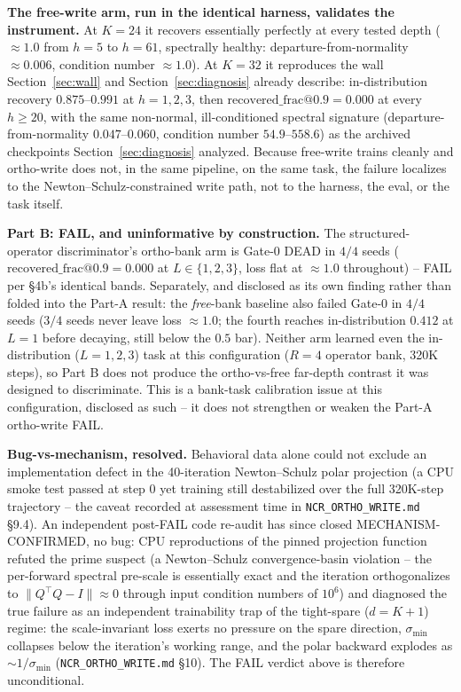 \textbf{The free-write arm, run in the identical harness, validates the
instrument.} At $K{=}24$ it recovers essentially perfectly at every
tested depth ($\approx 1.0$ from $h{=}5$ to $h{=}61$, spectrally healthy:
departure-from-normality $\approx 0.006$, condition number $\approx 1.0$).
At $K{=}32$ it reproduces the wall Section~\ref{sec:wall} and
Section~\ref{sec:diagnosis} already describe: in-distribution recovery
$0.875$--$0.991$ at $h{=}1,2,3$, then $\mathrm{recovered\_frac@0.9} =
0.000$ at every $h \geq 20$, with the same non-normal, ill-conditioned
spectral signature (departure-from-normality $0.047$--$0.060$, condition
number $54.9$--$558.6$) as the archived checkpoints
Section~\ref{sec:diagnosis} analyzed. Because free-write trains cleanly
and ortho-write does not, in the same pipeline, on the same task, the
failure localizes to the Newton--Schulz-constrained write path, not to
the harness, the eval, or the task itself.

\textbf{Part B: FAIL, and uninformative by construction.} The structured-
operator discriminator's ortho-bank arm is Gate-0 DEAD in $4/4$ seeds
($\mathrm{recovered\_frac@0.9} = 0.000$ at $L \in \{1,2,3\}$, loss flat at
$\approx 1.0$ throughout) -- FAIL per \S4b's identical bands. Separately,
and disclosed as its own finding rather than folded into the Part-A
result: the \emph{free}-bank baseline also failed Gate-0 in $4/4$ seeds
($3/4$ seeds never leave loss $\approx 1.0$; the fourth reaches
in-distribution $0.412$ at $L{=}1$ before decaying, still below the $0.5$
bar). Neither arm learned even the in-distribution ($L{=}1,2,3$) task at
this configuration ($R{=}4$ operator bank, 320K steps), so Part B does
not produce the ortho-vs-free far-depth contrast it was designed to
discriminate. This is a bank-task calibration issue at this
configuration, disclosed as such -- it does not strengthen or weaken the
Part-A ortho-write FAIL.

\textbf{Bug-vs-mechanism, resolved.} Behavioral data alone could not
exclude an implementation defect in the 40-iteration Newton--Schulz
polar projection (a CPU smoke test passed at step 0 yet training still
destabilized over the full 320K-step trajectory -- the caveat recorded
at assessment time in \texttt{NCR\_ORTHO\_WRITE.md} \S9.4). An
independent post-FAIL code re-audit has since closed
MECHANISM-CONFIRMED, no bug: CPU reproductions of the pinned projection
function refuted the prime suspect (a Newton--Schulz convergence-basin
violation -- the per-forward spectral pre-scale is essentially exact and
the iteration orthogonalizes to $\|Q^\top Q - I\| \approx 0$ through
input condition numbers of $10^6$) and diagnosed the true failure as an
independent trainability trap of the tight-spare ($d{=}K{+}1$) regime:
the scale-invariant loss exerts no pressure on the spare direction,
$\sigma_{\min}$ collapses below the iteration's working range, and the
polar backward explodes as $\sim 1/\sigma_{\min}$
(\texttt{NCR\_ORTHO\_WRITE.md} \S10). The FAIL verdict above is
therefore unconditional.

